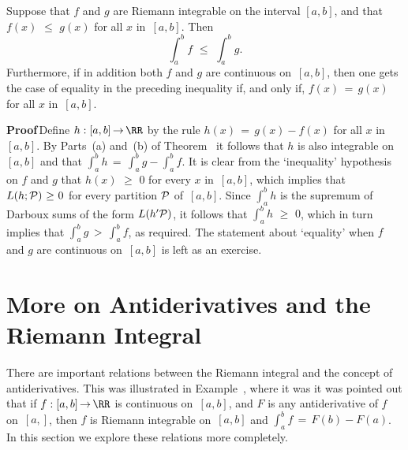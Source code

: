 \V

        Suppose that $f$ and $g$ are Riemann integrable on the interval $[a,b]$, and that $f(x)\,\,{\leq}\,\,g(x)$ for all $x$ in~$[a,b]$. Then
        \begin{displaymath}
        \int_{a}^{b} f\,\,{\leq}\,\,\int_{a}^{b} g.
        \end{displaymath}
    Furthermore, if in addition both $f$ and $g$ are continuous on~$[a,b]$, then one gets the case of equality in the preceding inequality if, and only if, $f(x) \,=\, g(x)$ for all $x$ in~$[a,b]$.

\V

        {\bf Proof}\,Define $h:[a,b] \,{\rightarrow}\, {\RR}$ by the rule $h(x) \,=\, g(x)-f(x)$ for all $x$ in~$[a,b]$.
    By Parts~(a) and~(b) of Theorem~ it follows that $h$ is also integrable on $[a,b]$ and that ${\displaystyle \int_{a}^{b} h \,=\, \int_{a}^{b} g - \int_{a}^{b} f}$.
    It is clear from the `inequality' hypothesis on $f$ and $g$  that $h(x)\,\,{\geq}\,\,0$ for every $x$ in~$[a,b]$, which implies that $L(h;{\cal P})\,\,{\geq}\,\,0$ for every partition ${\cal P}$ of~$[a,b]$.
    Since ${\displaystyle \int_{a}^{b}} h$ is the supremum of Darboux sums of the form $L(h'{\cal P})$, it follows that $\int_{a}^{b} h\,\,{\geq}\,\,0$,
    which in turn implies that ${\displaystyle \int_{a}^{b} g\,>\,\int_{a}^{b}f}$, as required. The statement about `equality' when $f$ and $g$ are continuous on~$[a,b]$ is left as an exercise. \Q %




\V


\V

        \section{More on Antiderivatives and the Riemann Integral}
                \label{SectH40}

\V

        There are important relations between the Riemann integral and the concept of antiderivatives. This was illustrated in Example~,
    where it was it was pointed out that if $f:[a,b] \,{\rightarrow}\, {\RR}$ is continuous on~$[a,b]$, and $F$ is any antiderivative of $f$ on~$[a,]$,
    then $f$ is Riemann integrable on~$[a,b]$ and ${\displaystyle \int_{a}^{b} f \,=\, F(b)-F(a)}$. In this section we explore these relations more completely.

